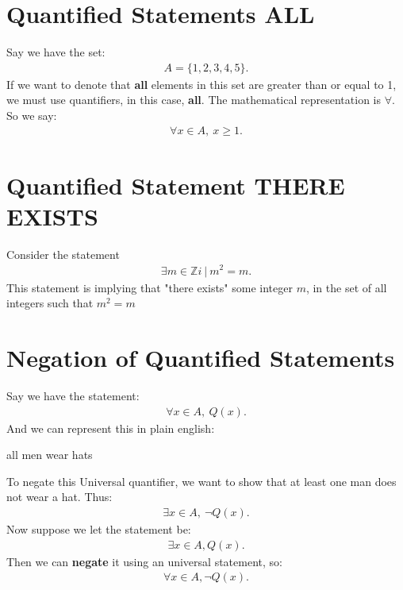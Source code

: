 \documentclass{report}
\begin{document}
    \bigbreak \noindent \bigbreak \noindent 
    \section{Quantified Statements ALL}
    \bigbreak \noindent 
    Say we have the set:
    \begin{align*}
        A = \{1,2,3,4,5\}
    .\end{align*}
    \bigbreak \noindent 
    If we want to denote that \textbf{all} elements in this set are greater than or equal to 1, we must use quantifiers, in this case, \textbf{all}. The mathematical representation is $\forall$. So we say:
    \begin{align*}
        \forall x \in A,\ x \geq 1
    .\end{align*}

   \pagebreak \bigbreak \noindent 
   \section{Quantified Statement THERE EXISTS}
   \bigbreak \noindent 
    Consider the statement
    \begin{align*}
        \exists m \in \mathbb{Z}i\ |\ m^{2} = m
    .\end{align*}
    This statement is implying that "there exists" some integer $m$, in the set of all integers such that $m^{2} = m$

    \bigbreak \noindent \bigbreak \noindent 
    \section{Negation of Quantified Statements}
    \bigbreak \noindent 
    Say we have the statement:
    \begin{align*}
        \forall x \in A,\ Q(x)
    .\end{align*}
    \bigbreak \noindent 
    And we can represent this in plain english:
    \begin{center}
        all men wear hats
    \end{center}
    \bigbreak \noindent 
    To negate this Universal quantifier, we want to show that at least one man does not wear a hat. Thus:
    \begin{align*}
        \exists x \in A,\ \neg Q(x)
    .\end{align*}
    \bigbreak \noindent 
    Now suppose we let the statement be:
    \begin{align*}
        \exists x \in A, Q(x)
    .\end{align*}
    \bigbreak \noindent 
    Then we can \textbf{negate} it using an universal statement, so:
    \begin{align*}
        \forall x \in A, \neg Q(x)
    .\end{align*}








    






    
\end{document}
